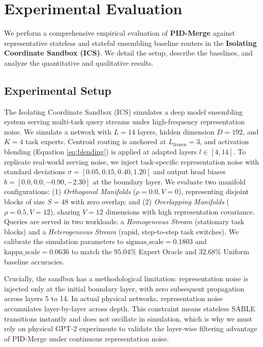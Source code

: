 \section{Experimental Evaluation}
\label{sec:experiments}

We perform a comprehensive empirical evaluation of \textbf{PID-Merge} against representative stateless and stateful ensembling baseline routers in the \textbf{Isolating Coordinate Sandbox (ICS)}. We detail the setup, describe the baselines, and analyze the quantitative and qualitative results.

\subsection{Experimental Setup}
The Isolating Coordinate Sandbox (ICS) simulates a deep model ensembling system serving multi-task query streams under high-frequency representation noise. We simulate a network with $L = 14$ layers, hidden dimension $D = 192$, and $K = 4$ task experts. Centroid routing is anchored at $L_{\text{frozen}} = 3$, and activation blending (Equation \ref{eq:blending}) is applied at adapted layers $l \in [4, 14]$. To replicate real-world serving noise, we inject task-specific representation noise with standard deviations $\sigma = [0.05, 0.15, 0.40, 1.20]$ and output head biases $b = [0.0, 0.0, -0.90, -2.30]$ at the boundary layer. We evaluate two manifold configurations: (1) \emph{Orthogonal Manifolds} ($\rho = 0.0, V = 0$), representing disjoint blocks of size $S=48$ with zero overlap; and (2) \emph{Overlapping Manifolds} ($\rho = 0.5, V = 12$), sharing $V=12$ dimensions with high representation covariance. Queries are served in two workloads: a \emph{Homogeneous Stream} (stationary task blocks) and a \emph{Heterogeneous Stream} (rapid, step-to-step task switches). We calibrate the simulation parameters to $\text{sigmas\_scale} = 0.1803$ and $\text{kappa\_scale} = 0.0636$ to match the $95.04\%$ Expert Oracle and $32.68\%$ Uniform baseline accuracies.

Crucially, the sandbox has a methodological limitation: representation noise is injected only at the initial boundary layer, with zero subsequent propagation across layers 5 to 14. In actual physical networks, representation noise accumulates layer-by-layer across depth. This constraint means stateless SABLE transitions instantly and does not oscillate in simulation, which is why we must rely on physical GPT-2 experiments to validate the layer-wise filtering advantage of PID-Merge under continuous representation noise.

